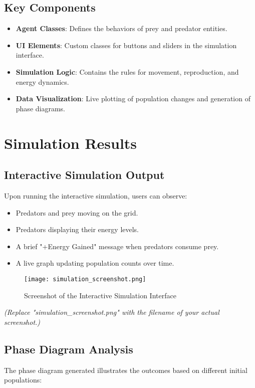 \documentclass[12pt]{article}
\begin{document}
\subsection{Key Components}
\begin{itemize}
    \item \textbf{Agent Classes}: Defines the behaviors of prey and predator entities.
    \item \textbf{UI Elements}: Custom classes for buttons and sliders in the simulation interface.
    \item \textbf{Simulation Logic}: Contains the rules for movement, reproduction, and energy dynamics.
    \item \textbf{Data Visualization}: Live plotting of population changes and generation of phase diagrams.
\end{itemize}

\section{Simulation Results}

\subsection{Interactive Simulation Output}
Upon running the interactive simulation, users can observe:

\begin{itemize}
    \item Predators and prey moving on the grid.
    \item Predators displaying their energy levels.
    \item A brief "+Energy Gained" message when predators consume prey.
    \item A live graph updating population counts over time.
\end{itemize}

\begin{figure}[H]
    \centering
    \texttt{[image: simulation\_screenshot.png]}
    \caption{Screenshot of the Interactive Simulation Interface}
    \label{fig:simulation_interface}
\end{figure}

\textit{(Replace "simulation\_screenshot.png" with the filename of your actual screenshot.)}

\subsection{Phase Diagram Analysis}
The phase diagram generated illustrates the outcomes based on different initial populations:
\end{document}
